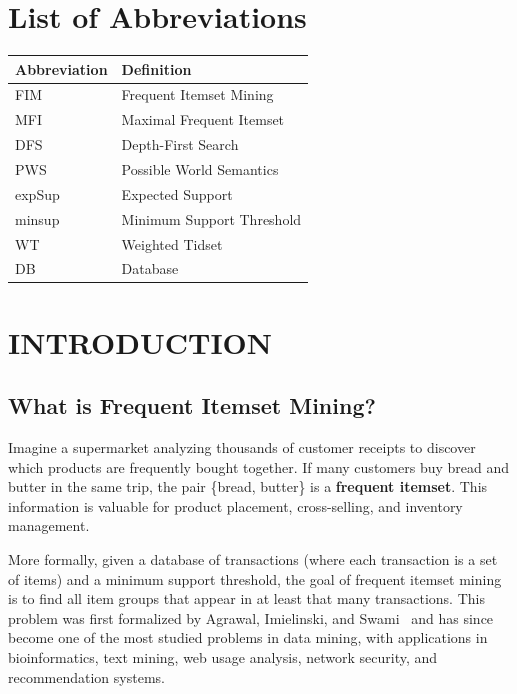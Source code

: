 \documentclass[12pt,a4paper]{report}
\begin{document}
  \chapter*{List of Abbreviations}

  \begin{tabular}{@{}ll@{}}
    \toprule
    \textbf{Abbreviation} & \textbf{Definition} \\
    \midrule
    FIM & Frequent Itemset Mining \\
    MFI & Maximal Frequent Itemset \\
    DFS & Depth-First Search \\
    PWS & Possible World Semantics \\
    expSup & Expected Support \\
    minsup & Minimum Support Threshold \\
    WT & Weighted Tidset \\
    DB & Database \\
    \bottomrule
  \end{tabular}

  \chapter{INTRODUCTION}

  \section{What is Frequent Itemset Mining?}

  Imagine a supermarket analyzing thousands of customer receipts to discover which products are frequently bought together. If many customers buy bread and butter in the same trip, the pair \{bread, butter\} is a \textbf{frequent itemset}. This information is valuable for product placement, cross-selling, and inventory management.

  More formally, given a database of transactions (where each transaction is a set of items) and a minimum support threshold, the goal of frequent itemset mining is to find all item groups that appear in at least that many transactions. This problem was first formalized by Agrawal, Imielinski, and Swami~\cite{agrawal1993} and has since become one of the most studied problems in data mining, with applications in bioinformatics, text mining, web usage analysis, network security, and recommendation systems.
\end{document}
